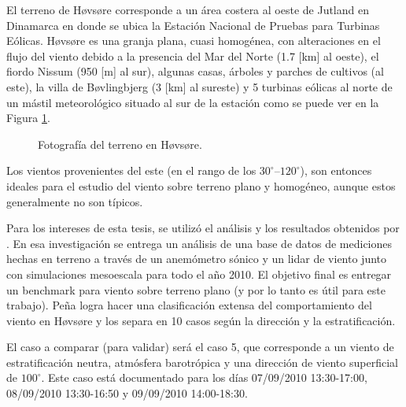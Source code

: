  El terreno de Høvsøre corresponde a un área costera al oeste de Jutland en Dinamarca en donde se ubica la Estación Nacional de Pruebas para Turbinas Eólicas. Høvsøre es una granja plana, cuasi homogénea, con alteraciones en el flujo del viento debido a la presencia del Mar del Norte (1.7 [km] al oeste), el fiordo Nissum (950 [m] al sur), algunas casas, árboles y parches de cultivos (al este), la villa de Bøvlingbjerg (3 [km] al sureste) y 5 turbinas eólicas al norte de un mástil meteorológico situado al sur de la estación como se puede ver en la Figura \ref{fig:05_terreno_hovsore}.
 
 \begin{figure}[H]
 	\centering{}%
 	\caption{Fotografía del terreno en Høvsøre.}
 	\label{fig:05_terreno_hovsore}
 \end{figure}
 
 Los vientos provenientes del este (en el rango de los $30^\circ$--$120^\circ$), son entonces ideales para el estudio del viento sobre terreno plano y homogéneo, aunque estos generalmente no son típicos.
 
 Para los intereses de esta tesis, se utilizó el análisis y los resultados obtenidos por \cite{Pea2013}. En esa investigación se entrega un análisis de una base de datos de mediciones hechas en terreno a través de un anemómetro sónico y un lidar de viento junto con simulaciones mesoescala para todo el año 2010. El objetivo final es entregar un benchmark para viento sobre terreno plano (y por lo tanto es útil para este trabajo). Peña logra hacer una clasificación extensa del comportamiento del viento en Høvsøre y los separa en 10 casos según la dirección y la estratificación.
 
 El caso a comparar (para validar) será el caso 5, que corresponde a un viento de estratificación neutra, atmósfera barotrópica y una dirección de viento superficial de $100^\circ$. Este caso está documentado para los días 07/09/2010 13:30-17:00, 08/09/2010 13:30-16:50 y 09/09/2010 14:00-18:30. 

